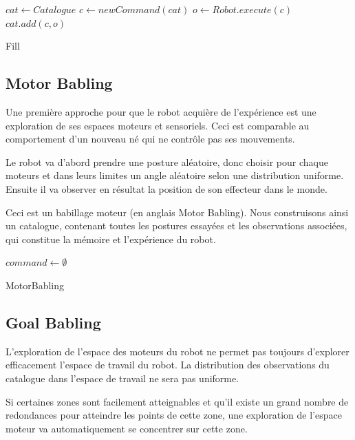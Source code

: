 \documentclass[11pt,french]{report}
\begin{document}
\begin{algorithm}[h]
    \DontPrintSemicolon
    \LinesNumbered
    $cat \leftarrow Catalogue$\;
     {
        $c \leftarrow newCommand(cat)$ \;
        $o \leftarrow Robot.execute(c)$\;
        $cat.add(c, o)$ \;
    }
    \caption{\label{alg:Fill} Fill}
\end{algorithm}

\subsection{Motor Babling}

Une première approche pour que le robot acquière de l'expérience est une exploration de ses espaces moteurs et sensoriels.
Ceci est comparable au comportement d'un nouveau né qui ne contrôle pas ses mouvements.

\phantom{INVISIBLE LINE}

Le robot va d'abord prendre une posture aléatoire, donc choisir pour chaque moteurs et dans leurs limites un angle aléatoire selon une distribution uniforme.
Ensuite il va observer en résultat la position de son effecteur dans le monde.

Ceci est un babillage moteur (en anglais Motor Babling).
Nous construisons ainsi un catalogue, contenant toutes les postures essayées et les observations associées, qui constitue la mémoire et l'expérience du robot.

\begin{algorithm}[h]
    \DontPrintSemicolon
    \LinesNumbered
    $command \leftarrow \emptyset$ \;
    \caption{\label{alg:MotorBabling} MotorBabling}
\end{algorithm}

\subsection{Goal Babling}

L'exploration de l'espace des moteurs du robot ne permet pas toujours d'explorer efficacement l'espace de travail du robot.
La distribution des observations du catalogue dans l'espace de travail ne sera pas uniforme.

Si certaines zones sont facilement atteignables et qu'il existe un grand nombre de redondances pour atteindre les points de cette zone, une exploration de l'espace moteur va automatiquement se concentrer sur cette zone.
\end{document}
